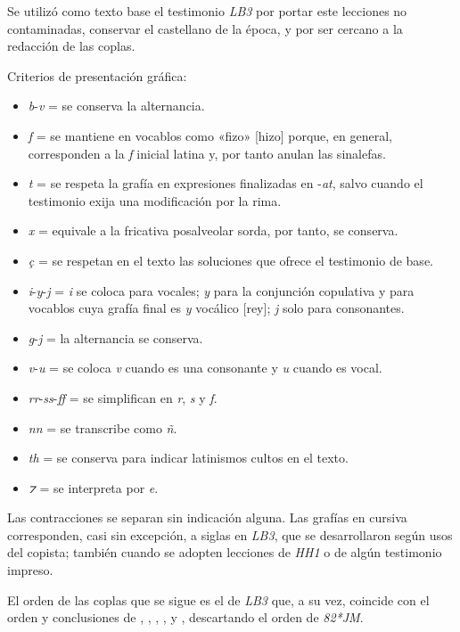 \documentclass[11pt,a4paper,twoside]{article}
\newcommand{\comillas}[1]{«#1»}
\begin{document}
Se utilizó como texto base el testimonio \textit{LB3} por portar este lecciones no contaminadas, conservar el castellano de la época, y por ser cercano a la redacción de las coplas.\par
%
Criterios de presentación gráfica:
%
\begin{itemize}[label=--]%
\item \textit{b}-\textit{v} = se conserva la alternancia.
\item \textit{f} = se mantiene en vocablos como \comillas{fizo} [hizo] porque, en general, corresponden a la \textit{f} inicial latina y, por tanto anulan las sinalefas.
\item \textit{t} = se respeta la grafía en expresiones finalizadas en -\textit{at}, salvo cuando el testimonio exija una modificación por la rima.
\item \textit{x} = equivale a la fricativa posalveolar sorda, por tanto, se conserva.
\item \textit{ç} = se respetan en el texto las soluciones que ofrece el testimonio de base.
\item \textit{i}-\textit{y}-\textit{j} = \textit{i} se coloca para vocales; \textit{y} para la conjunción copulativa y para vocablos cuya grafía final es \textit{y} vocálico [rey]; \textit{j} solo para consonantes.
\item \textit{g}-\textit{j} = la alternancia se conserva.
\item \textit{v}-\textit{u} = se coloca \textit{v} cuando es una consonante y \textit{u} cuando es vocal.
\item \textit{rr}-\textit{ss}-\textit{ff} = se simplifican en \textit{r}, \textit{s} y \textit{f}.
\item \textit{nn} = se transcribe como \textit{ñ}.
\item \textit{th} = se conserva para indicar latinismos cultos en el texto.
\item \textit{⁊} = se interpreta por \textit{e}.%
\end{itemize}\par
%
Las contracciones se separan sin indicación alguna. Las grafías en cursiva corresponden, casi sin excepción, a siglas en \textit{LB3}, que se desarrollaron según usos del copista; también cuando se adopten lecciones de \textit{HH1} o de algún testimonio impreso.\par
%
El orden de las coplas que se sigue es el de \textit{LB3} que, a su vez, coincide con el orden y conclusiones de \textcite{Senabre1983}, \textcite{Palumbo1983}, \textcite{Orduna1967}, \textcite{Beltrán1991,Beltrán2013}, \textcite{PérezPriego1990,PérezPriego2017} y \parencite{Foulché-Delbosc1902}, descartando el orden de \textit{82*JM}.\par
\end{document}
